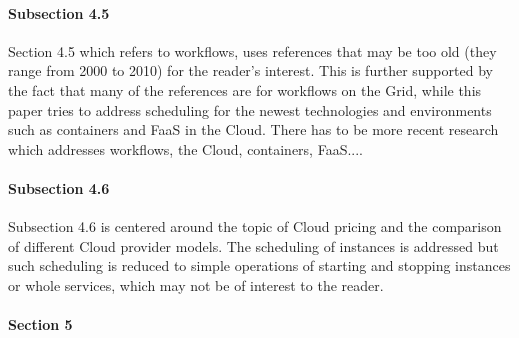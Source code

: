 
\paragraph{Subsection 4.5}

Section 4.5 which refers to workflows, uses references that may be too old (they range from 2000 to 2010) for the reader's interest. This is further supported by the fact that many of the references are for workflows on the Grid, while this paper tries to address scheduling for the newest technologies and environments such as containers and FaaS in the Cloud. There has to be more recent research which addresses workflows, the Cloud, containers, FaaS....





\paragraph{Subsection 4.6}

Subsection 4.6 is centered around the topic of Cloud pricing and the comparison of different Cloud provider models. The scheduling of instances is addressed but such scheduling is reduced to simple operations of starting and stopping instances or whole services, which may not be of interest to the reader.



\paragraph{Section 5}

